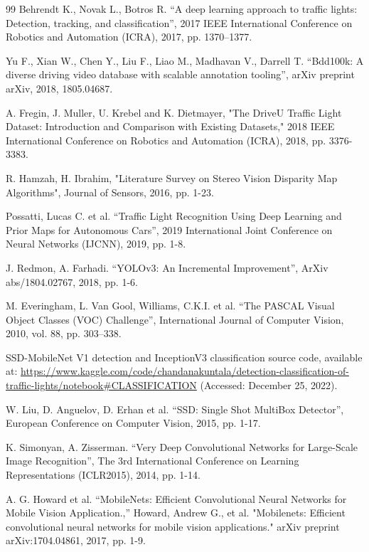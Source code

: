 \documentclass{misisarticle}
\begin{document}
\begin{thebibliography}{99}
 Behrendt K., Novak L., Botros R. “A deep learning approach to traffic lights: Detection, tracking, and classification”, 2017 IEEE International Conference on Robotics and Automation (ICRA), 2017, pp. 1370–1377.

 Yu F., Xian W., Chen Y., Liu F., Liao M., Madhavan V., Darrell T. “Bdd100k: A diverse driving video database with scalable annotation tooling”, arXiv preprint arXiv, 2018, 1805.04687.

 A. Fregin, J. Muller, U. Krebel and K. Dietmayer, "The DriveU Traffic Light Dataset: Introduction and Comparison with Existing Datasets," 2018 IEEE International Conference on Robotics and Automation (ICRA), 2018, pp. 3376-3383.

 R. Hamzah, H. Ibrahim, "Literature Survey on Stereo Vision Disparity Map Algorithms", Journal of Sensors, 2016, pp. 1-23.

 Possatti, Lucas C. et al. “Traffic Light Recognition Using Deep Learning and Prior Maps for Autonomous Cars”, 2019 International Joint Conference on Neural Networks (IJCNN), 2019, pp. 1-8.

 J. Redmon, A. Farhadi. “YOLOv3: An Incremental Improvement”, ArXiv abs/1804.02767, 2018, pp. 1-6.

 M. Everingham, L. Van Gool, Williams, C.K.I. et al. “The PASCAL Visual Object Classes (VOC) Challenge”, International Journal of Computer Vision, 2010, vol. 88, pp. 303–338.

 SSD-MobileNet V1 detection and InceptionV3 classification source code, available at: \url{https://www.kaggle.com/code/chandanakuntala/detection-classification-of-traffic-lights/notebook\#CLASSIFICATION} (Accessed: December 25, 2022).

 W. Liu, D. Anguelov, D. Erhan et al. “SSD: Single Shot MultiBox Detector”, European Conference on Computer Vision, 2015, pp. 1-17.

 K. Simonyan, A. Zisserman. “Very Deep Convolutional Networks for Large-Scale Image Recognition”, The 3rd International Conference on Learning Representations (ICLR2015), 2014, pp. 1-14.

 A. G. Howard et al. “MobileNets: Efficient Convolutional Neural Networks for Mobile Vision Application.,” Howard, Andrew G., et al. "Mobilenets: Efficient convolutional neural networks for mobile vision applications." arXiv preprint arXiv:1704.04861, 2017, pp. 1-9.


\end{thebibliography}
\end{document}

